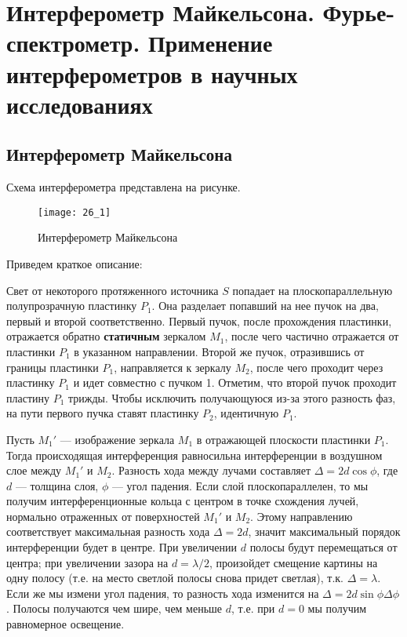 \section{Интерферометр Майкельсона. Фурье-спектрометр. Применение интерферометров в научных исследованиях}

\subsection{Интерферометр Майкельсона}

Схема интерферометра представлена на рисунке. 

\begin{figure}[H]
	\centering
	\texttt{[image: 26\_1]}
	\caption{Интерферометр Майкельсона}
\end{figure}

Приведем краткое описание:

Свет от некоторого протяженного источника $S$ попадает на плоскопараллельную полупрозрачную пластинку $P_1$. Она разделает попавший на нее пучок на два, первый и второй соответственно. Первый пучок, после прохождения пластинки, отражается обратно \textbf{статичным} зеркалом $M_1$, после чего частично отражается от пластинки $P_1$ в указанном направлении. Второй же пучок, отразившись от границы пластинки $P_1$, направляется к зеркалу $M_2$, после чего проходит через пластинку $P_1$ и идет совместно с пучком 1. Отметим, что второй пучок проходит пластину $P_1$ трижды. Чтобы исключить получающуюся из-за этого разность фаз, на пути первого пучка ставят пластинку $P_2$, идентичную $P_1$.

Пусть $M_1'$ --- изображение зеркала $M_1$ в отражающей плоскости пластинки $P_1$. Тогда происходящая интерференция равносильна интерференции в воздушном слое между $M_1'$ и $M_2$. Разность хода между лучами составляет $\Delta = 2 d\cos \phi$, где $d$ --- толщина слоя, $\phi$ --- угол падения. Если слой плоскопараллелен, то мы получим интерференционные кольца с центром в точке схождения лучей, нормально отраженных от поверхностей $M_1'$ и $M_2$. Этому направлению соответствует максимальная разность хода $\Delta = 2 d$, значит максимальный порядок интерференции будет в центре. При увеличении $d$ полосы будут перемещаться от центра; при увеличении зазора на $d = \lambda/2$, произойдет смещение картины на одну полосу (т.е. на место светлой полосы снова придет светлая), т.к. $\Delta = \lambda$. Если же мы измени угол падения, то разность хода изменится на $\Delta = 2 d \sin\phi \Delta\phi$. Полосы получаются чем шире, чем меньше $d$, т.е. при $d = 0$ мы получим равномерное освещение.

